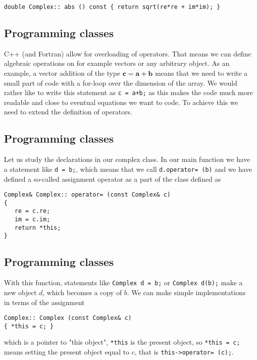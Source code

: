 \documentclass[%
oneside,                 %
final,                   %
10pt]{article}
\begin{document}
\begin{verbatim}
double Complex:: abs () const { return sqrt(re*re + im*im); }
\end{verbatim}

\subsection*{Programming classes}

C++ (and Fortran) allow for overloading of operators. That means we
can define algebraic operations on for example vectors or any
arbitrary object.  As an example, a vector addition of the type ${\bf
c} = {\bf a} + {\bf b}$ means that we need to write a small part of
code with a for-loop over the dimension of the array.  We would rather
like to write this statement as \Verb!c = a+b;! as this makes the code much
more readable and close to eventual equations we want to code.  To
achieve this we need to extend the definition of operators.

\subsection*{Programming classes}

Let us study the declarations in our complex class.
In our main function we have a statement like \Verb!d = b;!, which means
that we call \Verb!d.operator= (b)! and we have defined a so-called assignment operator
as a part of the class defined as

\begin{verbatim}
Complex& Complex:: operator= (const Complex& c)
{
   re = c.re;
   im = c.im;
   return *this;
}
\end{verbatim}

\subsection*{Programming classes}

With this function, statements like
\Verb!Complex d = b;! or \Verb!Complex d(b);!
make a new object $d$, which becomes a copy of $b$.
We can make simple implementations in terms of the assignment

\begin{verbatim}
Complex:: Complex (const Complex& c)
{ *this = c; }
\end{verbatim}
which  is a pointer to "this object", \Verb!*this! is the present object,
so \Verb!*this = c;! means setting the present object equal to $c$, that is
\Verb!this->operator= (c);!.
\end{document}
